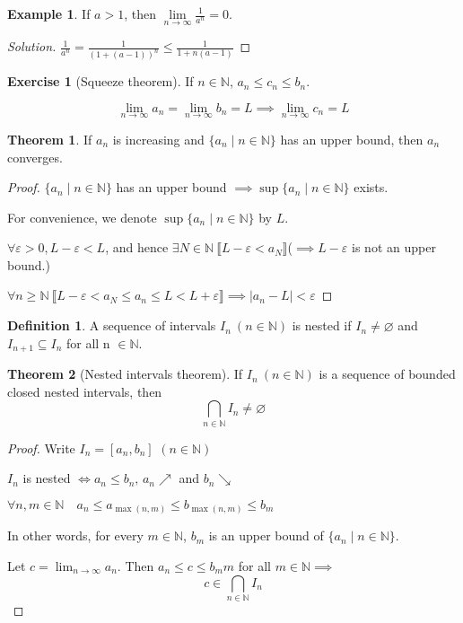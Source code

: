 \documentclass{article}
\theoremstyle{definition}
\newtheorem{theorem}{Theorem}
\newtheorem{example}{Example}
\newtheorem{definition}{Definition}
\newtheorem{exercise}{Exercise}
\begin{document}
\begin{example}
    If $a>1$, then $\lim\limits_{n \to \infty} \frac{1}{a^n}=0$.
\end{example}

\begin{proof}[Solution]
$\frac{1}{a^n}=\frac{1}{(1+(a-1))^n}\leq\frac{1}{1+n(a-1)}$
\end{proof}

\begin{exercise}[Squeeze theorem]
    If $n\in \mathbb{N}$, $a_n\leq c_n\leq b_n$.

    $$\lim_{n\to \infty} a_n=\lim_{n\to \infty} b_n = L \implies \lim_{n\to \infty} c_n = L$$
\end{exercise}

\begin{theorem}
    If $a_n$ is increasing and $\{a_n \mid n\in \mathbb{N}\}$ has an upper bound, then $a_n$ converges.
\end{theorem}
\begin{proof}
    $\{a_n\mid n\in \mathbb{N}\}$ has an upper bound $\implies \sup\{a_n\mid n\in \mathbb{N}\}$ exists.

    For convenience, we denote $\sup\{a_n\mid n\in \mathbb{N}\}$ by $L$.

    $\forall \varepsilon>0, L-\varepsilon<L$, and hence $\exists N\in \mathbb{N}\ \llbracket L-\varepsilon<a_N\rrbracket$($\implies L-\varepsilon$ is not an upper bound.)
    

    $\forall n \geq \mathbb{N}\ \llbracket L-\varepsilon<a_N\leq a_n\leq L < L + \varepsilon\rrbracket \implies |a_n-L|<\varepsilon$
\end{proof}

\begin{definition}
    A sequence of intervals $I_n\ (n\in \mathbb{N})$ is nested if $I_n\neq \varnothing$ and $I_{n+1} \subseteq I_n$ for all n $\in \mathbb{N}$.
\end{definition}

\begin{theorem}[Nested intervals theorem]
    If $I_n\ (n\in \mathbb{N})$ is a sequence of bounded closed nested intervals, then $$\bigcap_{n\in \mathbb{N}} I_n \neq \varnothing$$
\end{theorem}

\begin{proof}

    Write $I_n=[a_n,b_n]$ $(n\in \mathbb{N})$

    $I_n$ is nested $\iff a_n\leq b_n,\,a_n \nearrow$ and $b_n \searrow$

    $\forall n, m\in \mathbb{N}\quad a_n\leq a_{\max(n, m)}\leq b_{\max(n, m)}\leq b_m$
    
    In other words, for every $m\in \mathbb{N}$, $b_m$ is an upper bound of $\{a_n \mid n\in \mathbb{N}\}$.

    Let $c=\lim_{n\to \infty} a_n$. Then $a_n\leq c\leq b_mm$ for all $m\in \mathbb{N} \implies$ $$c \in \bigcap_{n\in \mathbb{N}} I_n$$
\end{proof}
\end{document}
